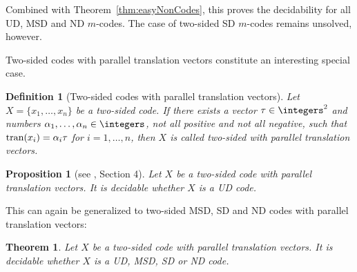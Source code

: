 \documentclass[final,nomarks]{dmtcs-episciences}
\newcommand{\dftransition}[1]{\mbox{\rm tran}(#1)}
\newtheorem{definition}{Definition}
\newtheorem{theorem}{Theorem}
\newtheorem{proposition}{Proposition}
\begin{document}
Combined with Theorem~\ref{thm:easyNonCodes}, this proves the
decidability for all UD, MSD and ND $m$-codes. The case of two-sided SD
$m$-codes remains unsolved, however.

Two-sided codes with parallel translation vectors constitute an interesting special case.

\begin{definition}[Two-sided codes with parallel translation vectors]
Let $X=\{x_1,\ldots,x_n\}$ be a two-sided code. If there exists
a vector $\tau\in\integers^2$ and numbers $\alpha_1,\ldots,\alpha_n\in\integers$,
not all positive and not all negative, such that
$\dftransition{x_i}=\alpha_i\tau$ for $i=1,\ldots,n$,
then $X$ is called \emph{two-sided with parallel translation vectors}.
\end{definition}


\begin{proposition}[see \cite{KolCOCOON}, Section 4]\label{prop:UDpar}
Let $X$ be a two-sided code with parallel translation vectors. 
It is decidable whether $X$ is a UD code.
\end{proposition}

This can again be generalized to two-sided MSD, SD and ND codes
with parallel translation vectors:

\begin{theorem}\label{th:line}
Let $X$ be a two-sided code with parallel translation vectors. 
It is decidable whether $X$ is a UD, MSD, SD or ND code.
\end{theorem}
\end{document}
